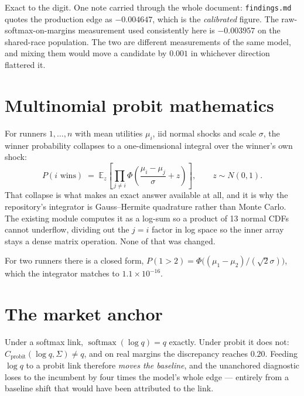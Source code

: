 \documentclass[11pt,a4paper]{article}
\begin{document}
Exact to the digit. One note carried through the whole document: \texttt{findings.md} quotes the
production edge as $-0.004647$, which is the \emph{calibrated} figure. The raw-softmax-on-margins
measurement used consistently here is $-0.003957$ on the shared-race population. The two are
different measurements of the same model, and mixing them would move a candidate by $0.001$ in
whichever direction flattered it.

\section{Multinomial probit mathematics}

For runners $1,\dots,n$ with mean utilities $\mu_i$, iid normal shocks and scale $\sigma$, the
winner probability collapses to a one-dimensional integral over the winner's own shock:
\[
P(i \text{ wins}) \;=\; \mathbb{E}_z\!\left[\prod_{j\neq i}
\Phi\!\left(\frac{\mu_i-\mu_j}{\sigma}+z\right)\right],
\qquad z\sim N(0,1).
\]
That collapse is what makes an exact answer available at all, and it is why the repository's
integrator is Gauss--Hermite quadrature rather than Monte Carlo. The existing module computes it
as a log-sum so a product of 13 normal CDFs cannot underflow, dividing out the $j=i$ factor in
log space so the inner array stays a dense matrix operation. None of that was changed.

For two runners there is a closed form, $P(1>2) = \Phi\big((\mu_1-\mu_2)/(\sqrt2\sigma)\big)$,
which the integrator matches to $1.1\times10^{-16}$.

\section{The market anchor}

Under a softmax link, $\operatorname{softmax}(\log q) = q$ exactly. Under probit it does not:
$C_{\text{probit}}(\log q,\Sigma) \neq q$, and on real margins the discrepancy reaches $0.20$.
Feeding $\log q$ to a probit link therefore \emph{moves the baseline}, and the unanchored
diagnostic loses to the incumbent by four times the model's whole edge --- entirely from a
baseline shift that would have been attributed to the link.
\end{document}
